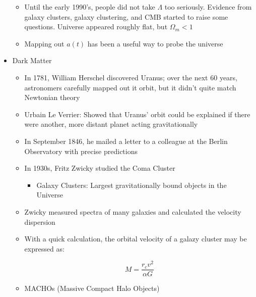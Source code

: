 \begin{itemize}
\begin{itemize}
      \item Until the early 1990's, people did not take $\Lambda$ too seriously. Evidence from galaxy clusters, galaxy clustering, and CMB started to raise some questions. Universe appeared roughly flat, but $\Omega_m<1$

      \item Mapping out $a(t)$ has been a useful way to probe the universe

    \end{itemize}

  \item Dark Matter

    \begin{itemize}

      \item In 1781, William Herschel discovered Uranus; over the next 60 years, astronomers carefully mapped out it orbit, but it didn't quite match Newtonian theory

      \item Urbain Le Verrier: Showed that Uranus' orbit could be explained if there were another, more distant planet acting gravitationally

      \item In September 1846, he mailed a letter to a colleague at the Berlin Observatory with precise predictions

      \item In 1930s, Fritz Zwicky studied the Coma Cluster

        \begin{itemize}

          \item Galaxy Clusters: Largest gravitationally bound objects in the Universe

        \end{itemize}

      \item Zwicky measured spectra of many galaxies and calculated the velocity dispersion

      \item With a quick calculation, the orbital velocity of a galazy cluster may be expressed as:

        $$M=\frac{r_cv^2}{\alpha G}$$

      \item MACHOs (Massive Compact Halo Objects)

        \begin{itemize}
            

\end{itemize}
\end{itemize}
\end{itemize}
